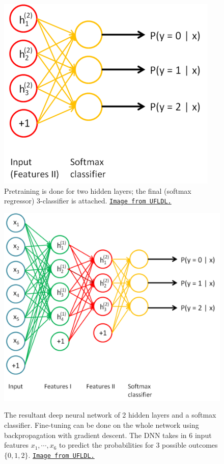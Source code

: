 \documentclass[12pt]{article}  %
\begin{document}
\begin{figure}[H]
\centering
\includegraphics[scale=1.1]{images/deep_3.png}\\
\caption{Pretraining is done for two hidden layers; the final (softmax regressor) 3-classifier is attached.  \href{http://deeplearning.stanford.edu/wiki/index.php/Stacked_Autoencoders}{\tt Image from UFLDL.}}\label{deep3}

\hspace{.1\linewidth}

\centering
\includegraphics[scale=1.3]{images/deep_4.png}\\
\caption{The resultant deep neural network of 2 hidden layers and a softmax classifier. Fine-tuning can be done on the whole network using backpropagation with gradient descent. The DNN takes in 6 input features $x_1, \cdots, x_6$ to predict the probabilities for 3 possible outcomes $\{0, 1, 2\}$. \href{http://deeplearning.stanford.edu/wiki/index.php/Stacked_Autoencoders}{\tt Image from UFLDL.}}\label{deep4}
\end{figure}
\end{document}
